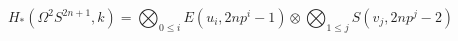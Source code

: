 $$H_*(\Omega^2 S^{2n+1}, k) = \bigotimes_{0 \leq i} E(u_i, 2np^i - 1) \otimes \bigotimes_{1 \leq j} S(v_j, 2np^j - 2)$$
